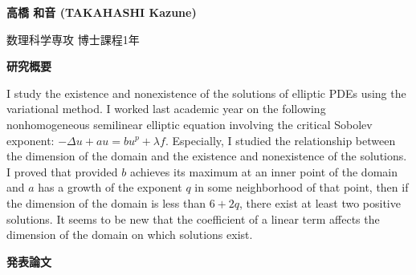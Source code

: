\documentclass[a4j,twocolumn]{jarticle}
\begin{document}



{\bf 高橋 和音 (TAKAHASHI Kazune)}




数理科学専攻 博士課程1年


\vspace{0.2cm}
\noindent
{\bf 研究概要}

\vspace{0.1cm}

I study the existence and nonexistence of the solutions
of elliptic PDEs using the variational method.
I worked last academic year on the following
nonhomogeneous semilinear elliptic equation
involving the critical Sobolev exponent:
$-\Delta u + a u = b u^p + \lambda f$. Especially, I studied
the relationship between the dimension of the domain and
the existence and nonexistence of the solutions.
I proved that provided 
$b$ achieves its maximum at an inner point of the
domain and $a$ has a growth of the exponent $q$
in some neighborhood of that point, then
if the dimension of the domain is less than $6 + 2q$,
there exist at least two positive solutions.
It seems to be new that the coefficient of a linear term affects
the dimension of the domain on which solutions exist. 

\vspace{0.2cm}
\noindent
{\bf 発表論文}

\vspace{0.1cm}
\end{document}
